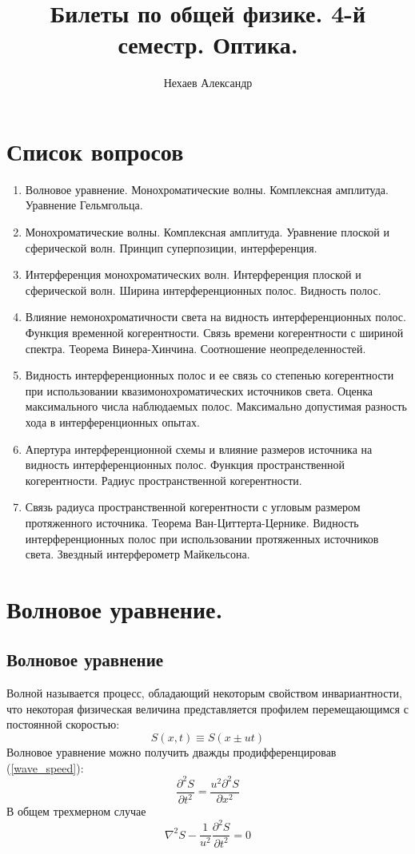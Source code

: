 \documentclass[a4paper, 12pt]{book}
\title{Билеты по общей физике. 4-й семестр. Оптика.}
\author{Нехаев Александр}
\begin{document}
	\maketitle
	\newpage
	\tableofcontents
	\chapter{Список вопросов}
	\begin{enumerate}
		\item Волновое уравнение. Монохроматические волны. Комплексная амплитуда. Уравнение Гельмгольца.
		\item Монохроматические волны. Комплексная амплитуда. Уравнение плоской и сферической волн. Принцип суперпозиции, интерференция.
		\item Интерференция монохроматических волн. Интерференция плоской и сферической волн. Ширина интерференционных полос. Видность полос.
		\item Влияние немонохроматичности света на видность интерференционных полос. Функция временной когерентности. Связь времени когерентности с шириной спектра. Теорема Винера-Хинчина. Соотношение неопределенностей.
		\item Видность интерференционных полос и ее связь со степенью когерентности при использовании квазимонохроматических источников света. Оценка максимального числа наблюдаемых полос. Максимально допустимая разность хода в интерференционных опытах.
		\item Апертура интерференционной схемы и влияние размеров источника на видность интерференционных полос. Функция пространственной когерентности. Радиус пространственной когерентности.
		\item Связь радиуса пространственной когерентности с угловым размером протяженного источника. Теорема Ван-Циттерта-Цернике. Видность интерференционных полос при использовании протяженных источников света. Звездный интерферометр Майкельсона.
	\end{enumerate}
	\chapter{Волновое уравнение.}
	\section{Волновое уравнение}
	Волной называется процесс, обладающий некоторым свойством инвариантности, что некоторая физическая величина представляется профилем перемещающимся с постоянной скоростью:
	\begin{equation}
		S\left(x,t\right)\equiv S\left(x\pm ut\right)
		\label{wave_speed}
	\end{equation}
	Волновое уравнение можно получить дважды продифференцировав (\ref{wave_speed}):
	\begin{equation}
		\frac{\partial^2 S}{\partial t^2}=\frac{u^2\partial^2 S}{\partial x^2}
	\end{equation}
	В общем трехмерном случае
	\begin{equation}
		\nabla^2 S-\frac{1}{u^2}\frac{\partial^2 S}{\partial t^2}=0
	\end{equation}
\end{document}
